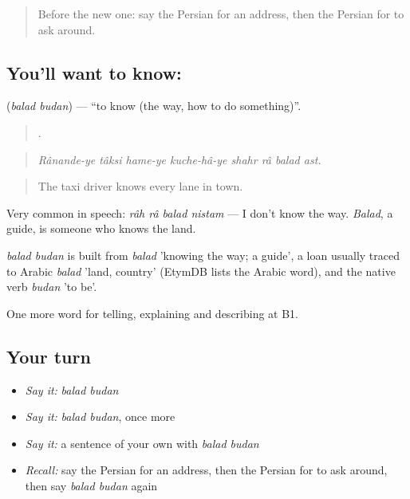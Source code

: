 \label{lesson:FA-C444-balad-budan}



\begin{quote}
Before the new one: say the Persian for an address, then the Persian for to ask around.
\end{quote}

\subsection*{You'll want to know:  }
\textbf{ } (\emph{balad budan}) — \textquotedblleft{}to know (the way, how to do something)\textquotedblright{}.

\begin{quote}
        .
\end{quote}

\begin{quote}
\emph{Rânande-ye tâksi hame-ye kuche-hâ-ye shahr râ balad ast.}
\end{quote}

\begin{quote}
The taxi driver knows every lane in town.
\end{quote}

Very common in speech: \emph{râh râ balad nistam} — I don't know the way. \emph{Balad}, a guide, is someone who knows the land.

\begin{cousinweb}
\emph{balad budan} is built from \emph{balad} 'knowing the way; a guide', a loan usually traced to Arabic \emph{balad} 'land, country' (EtymDB lists the Arabic word), and the native verb \emph{budan} 'to be'.
\end{cousinweb}

\begin{grammarlens}[title={What you've built}]
One more word for telling, explaining and describing at B1.
\end{grammarlens}

\subsection*{Your turn}
\begin{itemize}
\raggedright
  \item \emph{Say it:} \emph{balad budan}
  \item \emph{Say it:} \emph{balad budan}, once more
  \item \emph{Say it:} a sentence of your own with \emph{balad budan}
  \item \emph{Recall:} say the Persian for an address, then the Persian for to ask around, then say \emph{balad budan} again
\end{itemize}

